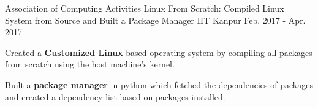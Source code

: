\begin{cventries}
  \cventry
    {Association of Computing Activities} %
    {Linux From Scratch: Compiled Linux System from Source and Built a Package Manager} %
    {IIT Kanpur} %
    {Feb. 2017 - Apr. 2017} %
    {
      \begin{cvitems} %
        \item {Created a \textbf{Customized Linux} based operating system by compiling all packages from scratch using the host machine's kernel.}
        \item {Built a \textbf{package manager} in python which fetched the dependencies of packages and created a dependency list based on packages installed.} 
      \end{cvitems}
    }

\end{cventries}
